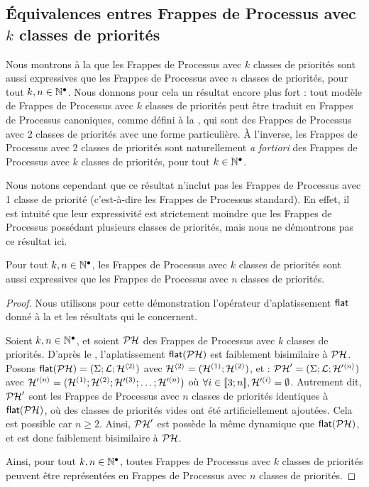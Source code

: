 \subsection{Équivalences entres Frappes de Processus avec $k$ classes de priorités}

Nous montrons à la  que les Frappes de Processus avec $k$ classes
de priorités sont aussi expressives que les Frappes de Processus avec $n$ classes de
priorités, pour tout $k, n \in \mathbb{N}^\bullet$.
Nous donnons pour cela un résultat encore plus fort : tout modèle de Frappes de Processus avec $k$
classes de priorités peut être traduit en Frappes de Processus canoniques,
comme défini à la ,
qui sont des Frappes de Processus avec 2 classes de priorités
avec une forme particulière.
À l'inverse, les Frappes de Processus avec 2 classes de priorités sont
naturellement \textit{a fortiori}
des Frappes de Processus avec $k$ classes de priorités, pour tout $k \in \mathbb{N}^\bullet$.

Nous notons cependant que ce résultat n'inclut pas les Frappes de Processus
avec 1 classe de priorité (c'est-à-dire les Frappes de Processus standard).
En effet, il est intuité que leur expressivité est strictement moindre
que les Frappes de Processus possédant plusieurs classes de priorités,
mais nous ne démontrons pas ce résultat ici.

\begin{theorem}
  Pour tout $k, n \in \mathbb{N}^\bullet$, les Frappes de Processus avec $k$ classes de priorités
  sont aussi expressives que les Frappes de Processus avec $n$ classes de priorités.
\end{theorem}

\begin{proof}
  Nous utilisons pour cette démonstration
  l'opérateur d'aplatissement $\mathsf{flat}$ donné à la 
  et les résultats qui le concernent.
  
  Soient $k, n \in \mathbb{N}^\bullet$,
  et soient $\mathcal{PH}$ des Frappes de Processus avec $k$ classes de priorités.
  D'après le ,
  l'aplatissement $\mathsf{flat}(\mathcal{PH})$ est faiblement bisimilaire à $\mathcal{PH}$.
  Posons $\mathsf{flat}(\mathcal{PH}) = (\Sigma; \mathcal{L}; \mathcal{H}^{{\langle 2 \rangle}})$
  avec $\mathcal{H}^{{\langle 2 \rangle}} = (\mathcal{H}^{(1)}; \mathcal{H}^{(2)})$,
  et : $\mathcal{PH}' = (\Sigma; \mathcal{L}; \mathcal{H}'^{{\langle n \rangle}})$
  avec $\mathcal{H}'^{{\langle n \rangle}} = (\mathcal{H}^{(1)}; \mathcal{H}^{(2)}; \mathcal{H}'^{(3)}; \ldots; \mathcal{H}'^{(n)})$
  où $\forall i \in \llbracket 3; n \rrbracket, \mathcal{H}'^{(i)} = \emptyset$.
  Autrement dit, $\mathcal{PH}'$ sont les Frappes de Processus avec $n$ classes de priorités
  identiques à $\mathsf{flat}(\mathcal{PH})$, où des classes de priorités vides ont été
  artificiellement ajoutées.
  Cela est possible car $n \geq 2$.
  Ainsi, $\mathcal{PH}'$ est possède la même dynamique que $\mathsf{flat}(\mathcal{PH})$,
  et est donc faiblement bisimilaire à $\mathcal{PH}$.
  
  Ainsi, pour tout $k, n \in \mathbb{N}^\bullet$,
  toutes Frappes de Processus avec $k$ classes de priorités peuvent être représentées
  en Frappes de Processus avec $n$ classes de priorités.
\end{proof}



